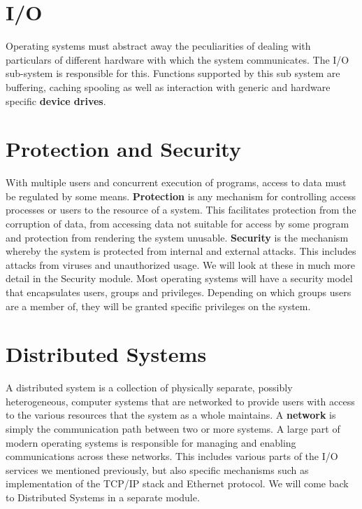 \documentclass[10pt,a4paper]{article}
\begin{document}
\section{I/O}
Operating systems must abstract away the peculiarities of dealing with particulars of different hardware with which the system communicates. The I/O sub-system is responsible for this. Functions supported by this sub system are buffering, caching spooling as well as interaction with generic and hardware specific {\bf device drives}.
\section{Protection and Security}
With multiple users and concurrent execution of programs, access to data must be regulated by some means. {\bf Protection} is any mechanism for controlling access processes or users to the resource of a system. This facilitates protection from the corruption of data, from accessing data not suitable for access by some program and protection from rendering the system unusable. {\bf Security} is the mechanism whereby the system is protected from internal and external attacks. This includes attacks from viruses and unauthorized usage. We will look at these in much more detail in the Security module. Most operating systems will have a security model that encapsulates users, groups and privileges. Depending on which groups users are a member of, they will be granted specific privileges on the system. 
\section{Distributed Systems}
A distributed system is a collection of physically separate, possibly heterogeneous, computer systems that are networked to provide users with access to the various resources that the system as a whole maintains. A {\bf network} is simply the communication path between two or more systems. A large part of modern operating systems is responsible for managing and enabling communications across these networks. This includes various parts of the I/O services we mentioned previously, but also specific mechanisms such as implementation of the TCP/IP stack and Ethernet protocol. We will come back to Distributed Systems in a separate module. 
\end{document}
